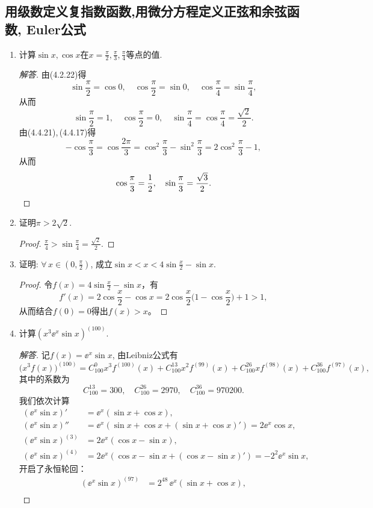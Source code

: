 \subsection{用级数定义复指数函数,用微分方程定义正弦和余弦函数, Euler公式}
\begin{4a}
\begin{enumerate}
\item 计算\(\sin x,\cos x\)在\(x=\frac{\pi}{2},\frac{\pi}{3},\frac{\pi}{4}\)等点的值.
\begin{proof}[解答]
由(4.2.22)得
\[\sin\frac{\pi}{2}=\cos0,\quad\cos\frac{\pi}{2}=\sin0,
\quad\cos\frac{\pi}{4}=\sin\frac{\pi}{4},\]
从而\[\sin\frac{\pi}{2}=1,\quad\cos\frac{\pi}{2}=0,
\quad\sin\frac{\pi}{4}=\cos\frac{\pi}{4}=\frac{\sqrt{2}}{2}.\]
由(4.4.21),\,(4.4.17)得
\[-\cos\frac{\pi}{3}=\cos\frac{2\pi}{3}
=\cos^2\frac{\pi}{3}-\sin^2\frac{\pi}{3}=2\cos^2\frac{\pi}{3}-1,\]
从而
\[\cos\frac{\pi}{3}=\frac{1}{2},\quad\sin\frac{\pi}{3}=\frac{\sqrt{3}}{2}.\qedhere\]
\end{proof}
\item 证明\(\pi>2\sqrt{2}\). 
\begin{proof}
\(\frac{\pi}{4}>\sin\frac{\pi}{4}=\frac{\sqrt{2}}{2}\).
\end{proof}
\item 证明: \(\forall\, x\in\left(0,\frac{\pi}{2}\right)\), 
成立\(\sin x<x<4\sin\frac{x}{2}-\sin x\).
\begin{proof}
令\(f(x)=4\sin\frac{x}{2}-\sin x\)，有
\[f'(x)=2\cos\frac{x}{2}-\cos x
=2\cos\frac{x}{2}\Big(1-\cos\frac{x}{2}\Big)+1>1,\]
从而结合$f(0)=0$得出$f(x)>x$。
\end{proof}
\item 计算\((x^3\ee^{x}\sin x)^{(100)}\).
\begin{proof}[解答]
记\(f(x)=\ee^x\sin x\), 由Leibniz公式有
\[\big(x^3f(x)\big)^{(100)}=C_{100}^0x^3f^{(100)}(x)+C_{100}^13x^2f^{(99)}(x)+C_{100}^26xf^{(98)}(x)+C_{100}^36f^{(97)}(x),\]
其中的系数为\[C_{100}^13=300,\quad C_{100}^26=2970,\quad C_{100}^36=970200.\]
我们依次计算\[\begin{split}
(\ee^x\sin x)'&=\ee^x(\sin x+\cos x),\\
(\ee^x\sin x)''&=\ee^x(\sin x+\cos x+(\sin x+\cos x)')=2\ee^x\cos x,\\
(\ee^x\sin x)^{(3)}&=2\ee^x(\cos x-\sin x),\\
(\ee^x\sin x)^{(4)}&=2\ee^x(\cos x-\sin x+(\cos x-\sin x)')=-2^2\ee^x\sin x,
\end{split}\]
开启了永恒轮回：\[\begin{split}
(\ee^x\sin x)^{(97)}&=2^{48}\,\ee^x(\sin x+\cos x),\\

\end{split}\]
\end{proof}
\end{enumerate}
\end{4a}
